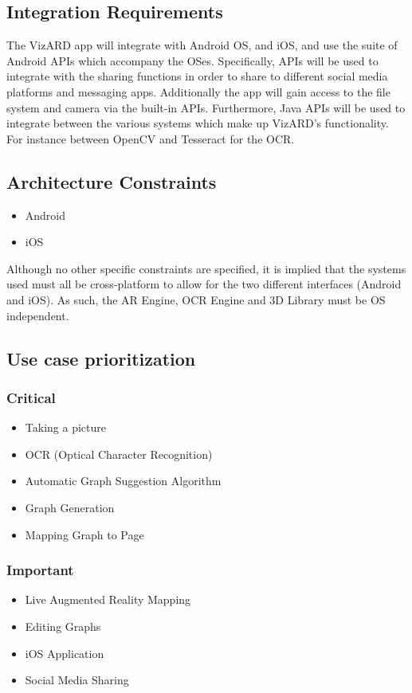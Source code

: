 \documentclass[a4paper,12pt]{article}
\begin{document}
\subsection{Integration Requirements}
The VizARD app will integrate with Android OS, and iOS, and use the suite of Android APIs which accompany the OSes. Specifically, APIs will be used to integrate with the sharing functions in order to share to different social media platforms and messaging apps. Additionally the app will gain access to the file system and camera via the built-in APIs. Furthermore, Java APIs will be used to integrate between the various systems which make up VizARD's functionality. For instance between OpenCV and Tesseract for the OCR.

\subsection{Architecture Constraints}
\begin{itemize}
	\item Android
	\item iOS
\end{itemize}
Although no other specific constraints are specified, it is implied that the systems used must all be cross-platform to allow for the two different interfaces (Android and iOS). As such, the AR Engine, OCR Engine and 3D Library must be OS independent.

\subsection{Use case prioritization}
	\subsubsection{Critical}
		\begin{itemize}
			\item Taking a picture
			\item OCR (Optical Character Recognition)
			\item Automatic Graph Suggestion Algorithm
			\item Graph Generation
			\item Mapping Graph to Page
		\end{itemize}
	\subsubsection{Important}
		\begin{itemize}
			\item Live Augmented Reality Mapping
			\item Editing Graphs
			\item iOS Application
			\item Social Media Sharing
		\end{itemize}
\end{document}
